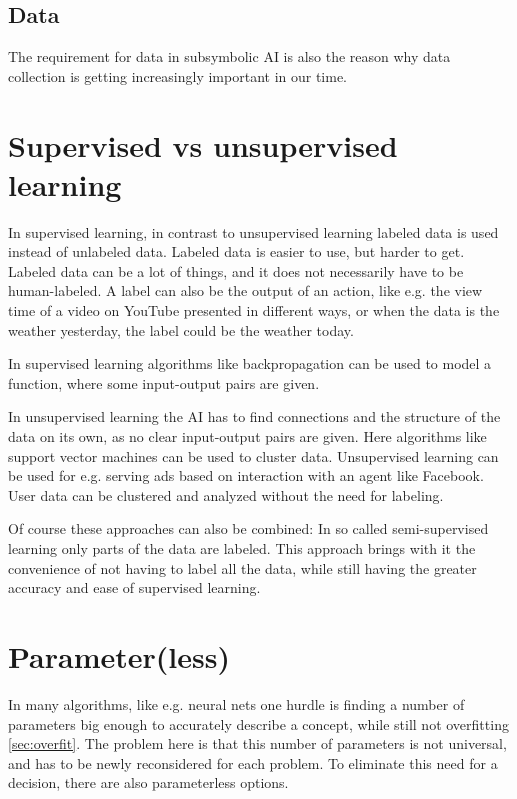 \subsection{Data}
The requirement for data in subsymbolic AI is also the reason why data collection is getting increasingly important in our time. 

\section{Supervised vs unsupervised learning} \cite[p695]{MA}
In supervised learning, in contrast to unsupervised learning labeled data is used instead of unlabeled data. 
Labeled data is easier to use, but harder to get. Labeled data can be a lot of things, and it does not necessarily have to be human-labeled. A label can also be the output of an action, like e.g. the view time of a video on YouTube presented in different ways, or when the data is the weather yesterday, the label could be the weather today.

In supervised learning algorithms like backpropagation can be used to model a function, where some input-output pairs are given.

In unsupervised learning the AI has to find connections and the structure of the data on its own, as no clear input-output pairs are given.
Here algorithms like support vector machines can be used to cluster data. Unsupervised learning can be used for e.g. serving ads based on interaction with an agent like Facebook. User data can be clustered and analyzed without the need for labeling.

Of course these approaches can also be combined: In so called semi-supervised learning only parts of the data are labeled. This approach brings with it the convenience of not having to label all the data, while still having the greater accuracy and ease of supervised learning.

\section{Parameter(less)} \cite[p737]{MA}
In many algorithms, like e.g. neural nets one hurdle is finding a number of parameters big enough to accurately describe a concept, while still not  overfitting \autoref{sec:overfit}. The problem here is that this number of parameters is not universal, and has to be newly reconsidered for each problem. To eliminate this need for a decision, there are also parameterless options. 

